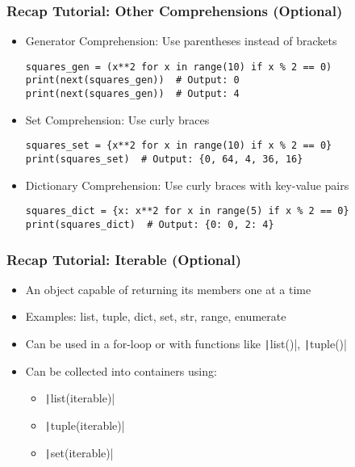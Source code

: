 \documentclass{beamer}
\begin{document}
\begin{frame}[fragile]
    \frametitle{Recap Tutorial: Other Comprehensions (Optional)}
    \begin{itemize}
        \item Generator Comprehension: Use parentheses instead of brackets
              \begin{verbatim}
squares_gen = (x**2 for x in range(10) if x % 2 == 0)
print(next(squares_gen))  # Output: 0
print(next(squares_gen))  # Output: 4
              \end{verbatim}
        \item Set Comprehension: Use curly braces
              \begin{verbatim}
squares_set = {x**2 for x in range(10) if x % 2 == 0}
print(squares_set)  # Output: {0, 64, 4, 36, 16}
              \end{verbatim}
        \item Dictionary Comprehension: Use curly braces with key-value pairs
              \begin{verbatim}
squares_dict = {x: x**2 for x in range(5) if x % 2 == 0}
print(squares_dict)  # Output: {0: 0, 2: 4}
              \end{verbatim}
    \end{itemize}
\end{frame}

\begin{frame}
    \frametitle{Recap Tutorial: Iterable (Optional)}
    \begin{itemize}
        \item An object capable of returning its members one at a time
        \item Examples: list, tuple, dict, set, str, range, enumerate
        \item Can be used in a for-loop or with functions like \texttt|list()|, \texttt|tuple()|
        \item Can be collected into containers using:
              \begin{itemize}
                  \item \texttt|list(iterable)|
                  \item \texttt|tuple(iterable)|
                  \item \texttt|set(iterable)|
              \end{itemize}
    \end{itemize}
\end{frame}
\end{document}
